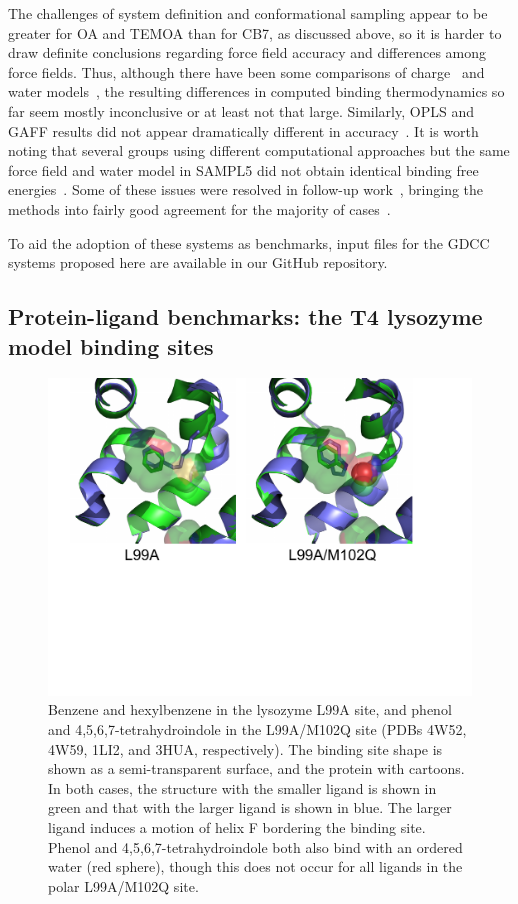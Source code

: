 \documentclass[aps,pre,twocolumn,nofootinbib,superscriptaddress,10pt, final,tightenlines]{revtex4-1}
\begin{document}
The challenges of system definition and conformational sampling appear to be greater for OA and TEMOA than for CB7, as discussed above, so it is harder to draw definite conclusions regarding force field accuracy and differences among force fields. 
Thus, although there have been some comparisons of charge~\cite{mikulskis_free-energy_2014, muddana_sampl4_2014, monroe_converging_2014} and water models~\cite{yin_sampl5_2016}, the resulting differences in computed binding thermodynamics so far seem mostly inconclusive or at least not that large. 
Similarly, OPLS and GAFF results did not appear dramatically different in accuracy~\cite{bhakat_resolving_2016}.
It is worth noting that several groups using different computational approaches but the same force field and water model in SAMPL5 did not obtain identical binding free energies~\cite{yin_overview_2016, bosisio_blinded_2016, bhakat_resolving_2016}. 
Some of these issues were resolved in follow-up work~\cite{bhakat_resolving_2016}, bringing the methods into fairly good agreement for the majority of cases~\cite{yin_sampl5_2016, bosisio_blinded_2016}.

To aid the adoption of these systems as benchmarks, input files for the GDCC systems proposed here are available in our GitHub repository. 

\subsection{Protein-ligand benchmarks: the T4 lysozyme model binding sites}
\label{sec:t4}
\begin{figure}
\includegraphics[width=\textwidth]{figures/lysozyme.pdf}
\caption{\label{fig:lysozyme} 
Benzene and hexylbenzene in the lysozyme L99A site, and phenol and 4,5,6,7-tetrahydroindole in the L99A/M102Q site (PDBs 4W52, 4W59, 1LI2, and 3HUA, respectively).
The binding site shape is shown as a semi-transparent surface, and the protein with cartoons.
In both cases, the structure with the smaller ligand is shown in green and that with the larger ligand is shown in blue.
The larger ligand induces a motion of helix F bordering the binding site.
Phenol and 4,5,6,7-tetrahydroindole both also bind with an ordered water (red sphere), though this does not occur for all ligands in the polar L99A/M102Q site.
}
\end{figure}
\end{document}
